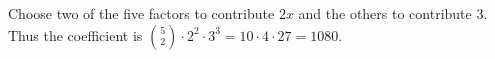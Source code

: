 Choose two of the five factors to contribute $2x$ and the others to contribute $3$. Thus the coefficient is $\binom52\cdot2^2\cdot3^3=10\cdot4\cdot27=\boxed{1080}$.
